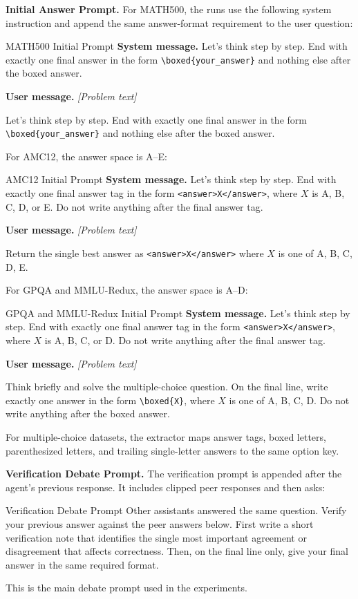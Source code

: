 \textbf{Initial Answer Prompt.}
\label{app:prompt_initial_answer}
For MATH500, the runs use the following system instruction and append the same
answer-format requirement to the user question:
\begin{promptbox}{MATH500 Initial Prompt}
\small
\textbf{System message.}
Let's think step by step. End with exactly one final answer in the form
\texttt{\textbackslash boxed\{your\_answer\}} and nothing else after the boxed answer.

\medskip
\textbf{User message.}
\emph{[Problem text]}

Let's think step by step. End with exactly one final answer in the form
\texttt{\textbackslash boxed\{your\_answer\}} and nothing else after the boxed answer.
\end{promptbox}
For AMC12, the answer space is A--E:
\begin{promptbox}{AMC12 Initial Prompt}
\small
\textbf{System message.}
Let's think step by step. End with exactly one final answer tag in the form
\texttt{<answer>X</answer>}, where $X$ is A, B, C, D, or E. Do not write
anything after the final answer tag.

\medskip
\textbf{User message.}
\emph{[Problem text]}

Return the single best answer as \texttt{<answer>X</answer>} where $X$ is one
of A, B, C, D, E.
\end{promptbox}
For GPQA and MMLU-Redux, the answer space is A--D:
\begin{promptbox}{GPQA and MMLU-Redux Initial Prompt}
\small
\textbf{System message.}
Let's think step by step. End with exactly one final answer tag in the form
\texttt{<answer>X</answer>}, where $X$ is A, B, C, or D. Do not write anything
after the final answer tag.

\medskip
\textbf{User message.}
\emph{[Problem text]}

Think briefly and solve the multiple-choice question. On the final line, write
exactly one answer in the form \texttt{\textbackslash boxed\{X\}}, where $X$ is
one of A, B, C, D. Do not write anything after the boxed answer.
\end{promptbox}
For multiple-choice datasets, the extractor maps answer tags, boxed letters,
parenthesized letters, and trailing single-letter answers to the same option key.

\textbf{Verification Debate Prompt.}
\label{app:prompt_verify_then_answer}
The verification prompt is appended after the agent's previous response. It
includes clipped peer responses and then asks:
\begin{promptbox}{Verification Debate Prompt}
\small
Other assistants answered the same question. Verify your previous answer
against the peer answers below. First write a short verification note that
identifies the single most important agreement or disagreement that affects
correctness. Then, on the final line only, give your final answer in the same
required format.
\end{promptbox}
This is the main debate prompt used in the experiments.

